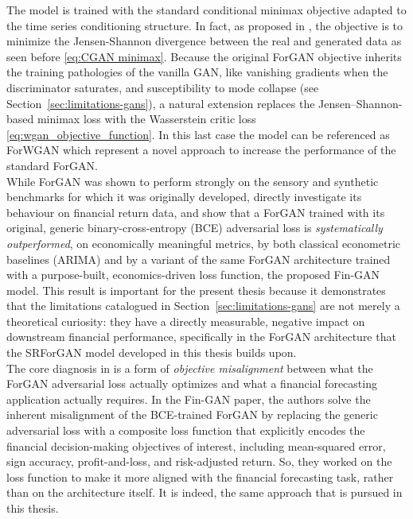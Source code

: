 The model is trained with the standard conditional minimax objective adapted to the time series conditioning structure. In fact, as proposed in \cite{background:forgan}, the objective is to minimize the Jensen-Shannon divergence between the real and generated data as seen before \ref{eq:CGAN minimax}.
Because the original ForGAN objective inherits the training pathologies
of the vanilla GAN, like vanishing gradients when the discriminator saturates,
and susceptibility to mode collapse (see Section~\ref{sec:limitations-gans}), 
a natural extension replaces the Jensen--Shannon-based minimax loss with the Wasserstein critic loss \ref{eq:wgan_objective_function}.
In this last case the model can be referenced as ForWGAN which represent a novel 
approach to increase the performance of the standard ForGAN.\\

While ForGAN 
was shown to perform strongly on the sensory
and synthetic benchmarks
for which it was originally developed, \cite{forgan:fin_gan} directly investigate 
its behaviour on financial return data, 
and show that a ForGAN trained with its original, 
generic binary-cross-entropy (BCE) adversarial loss is \emph{systematically outperformed},
on economically meaningful metrics, by both classical econometric baselines (ARIMA)
and by a variant of the same ForGAN architecture trained with a purpose-built, 
economics-driven loss function, the proposed Fin-GAN model.
This result is important for the present thesis because it demonstrates 
that the limitations catalogued in Section~\ref{sec:limitations-gans} 
are not merely a theoretical curiosity: 
they have a directly measurable, negative impact on downstream financial performance,
specifically in the ForGAN architecture that the SRForGAN model developed in this thesis builds upon.\\
The core diagnosis in \cite{forgan:fin_gan} 
is a form of \emph{objective misalignment} between what the ForGAN 
adversarial loss actually optimizes and what a 
financial forecasting application actually requires. 
In the Fin-GAN paper, the authors solve the inherent misalignment of the BCE-trained ForGAN by replacing the generic adversarial loss with a composite loss function that explicitly encodes 
the financial decision-making objectives of interest, 
including mean-squared error, sign accuracy, profit-and-loss, and risk-adjusted return. 
So, they worked on the loss function to make it more aligned with the financial forecasting task, 
rather than on the architecture itself. It is indeed, the same approach that is pursued in this thesis.\\


